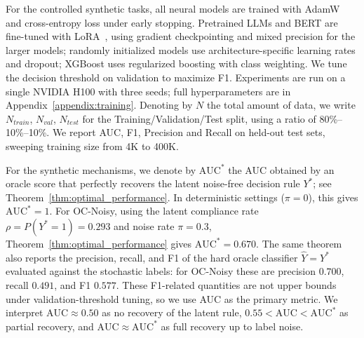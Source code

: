 \documentclass[fullpaper]{nldl}
\theoremstyle{plain}
\theoremstyle{definition}
\theoremstyle{remark}
\begin{document}
For the controlled synthetic tasks, all neural models are trained with AdamW~\citep{AdamW} and cross-entropy loss under early stopping. Pretrained LLMs and BERT are fine-tuned with LoRA~\citep{LoRA}, using gradient checkpointing and mixed precision for the larger models; randomly initialized models use architecture-specific learning rates and dropout; XGBoost uses regularized boosting with class weighting. We tune the decision threshold on validation to maximize F1. Experiments are run on a single NVIDIA H100 with three seeds; full hyperparameters are in Appendix~\ref{appendix:training}. Denoting by $N$ the total amount of data, we write $N_{train}$, $N_{val}$, $N_{test}$ for the Training/Validation/Test split, using a ratio of 80\%--10\%--10\%. We report AUC, F1, Precision and Recall on held-out test sets, sweeping training size from 4K to 400K.

For the synthetic mechanisms, we denote by $\mathrm{AUC}^*$ the AUC obtained by an oracle score that perfectly recovers the latent noise-free decision rule $Y^*$; see Theorem~\ref{thm:optimal_performance}. In deterministic settings ($\pi=0$), this gives $\mathrm{AUC}^*=1$. For OC-Noisy, using the latent compliance rate $\rho = P(Y^*=1)=0.293$ and noise rate $\pi=0.3$, Theorem~\ref{thm:optimal_performance} gives $\mathrm{AUC}^*=0.670$. The same theorem also reports the precision, recall, and F1 of the hard oracle classifier $\hat Y=Y^*$ evaluated against the stochastic labels: for OC-Noisy these are precision $0.700$, recall $0.491$, and F1 $0.577$. These F1-related quantities are not upper bounds under validation-threshold tuning, so we use AUC as the primary metric. We interpret $\mathrm{AUC}\approx 0.50$ as no recovery of the latent rule, $0.55<\mathrm{AUC}<\mathrm{AUC}^*$ as partial recovery, and
$\mathrm{AUC}\approx\mathrm{AUC}^*$ as full recovery up to label noise.
\end{document}
